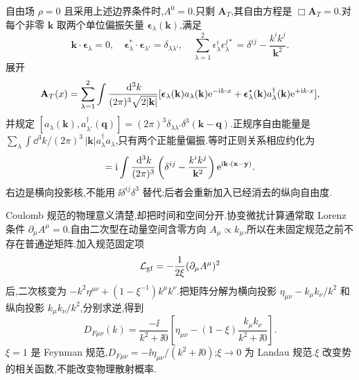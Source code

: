 自由场 $\rho=0$ 且采用上述边界条件时,$A^0=0$.只剩 $\mathbf A_T$,其自由方程是 $\Box\mathbf A_T=0$.对每个非零 $\mathbf k$ 取两个单位偏振矢量 $\boldsymbol\epsilon_\lambda(\mathbf k)$,满足
\begin{equation}
 \mathbf k\cdot\boldsymbol\epsilon_\lambda=0,
 \quad\boldsymbol\epsilon_\lambda^*\cdot\boldsymbol\epsilon_{\lambda'}=\delta_{\lambda\lambda'},
 \quad\sum_{\lambda=1}^2\epsilon_\lambda^i\epsilon_\lambda^{j*}
 =\delta^{ij}-\frac{k^ik^j}{\mathbf k^2}.
\end{equation}
展开
\begin{equation}
 \mathbf A_T(x)=\sum_{\lambda=1}^2\int\frac{\,\mathrm d^3k}{(2\pi)^3\sqrt{2|\mathbf k|}}
 [\boldsymbol\epsilon_\lambda(\mathbf k)a_\lambda(\mathbf k)\mathrm e^{-\mathrm i k\cdot x}
 +\boldsymbol\epsilon_\lambda^*(\mathbf k)a_\lambda^\dagger(\mathbf k)\mathrm e^{+\mathrm i k\cdot x}],
\end{equation}
并规定 $[a_\lambda(\mathbf k),a_{\lambda'}^\dagger(\mathbf q)]=(2\pi)^3\delta_{\lambda\lambda'}\delta^3(\mathbf k-\mathbf q)$.正规序自由能量是 $\sum_\lambda\int\dd^3k/(2\pi)^3\,|\mathbf k|a_\lambda^\dagger a_\lambda$,只有两个正能量偏振.等时正则关系相应约化为
\begin{equation}
 [A_T^i(t,\mathbf x),\Pi_T^j(t,\mathbf y)]
 =\ii\int\frac{\dd^3k}{(2\pi)^3}
 \left(\delta^{ij}-\frac{k^ik^j}{\mathbf k^2}\right)
 \e^{\ii\mathbf k\cdot(\mathbf x-\mathbf y)}.
\end{equation}
右边是横向投影核,不能用 $\ii\delta^{ij}\delta^3$ 替代;后者会重新加入已经消去的纵向自由度.


Coulomb 规范的物理意义清楚,却把时间和空间分开.协变微扰计算通常取 Lorenz 条件 $\partial_\mu A^\mu=0$.自由二次型在动量空间含零方向 $A_\mu\propto k_\mu$,所以在未固定规范之前不存在普通逆矩阵.加入规范固定项
\begin{equation}
 \mathcal L_{\rm gf}=-\frac{1}{2\xi}(\partial_\mu A^\mu)^2
\end{equation}
后,二次核变为 $-k^2\eta^{\mu\nu}+(1-\xi^{-1})k^\mu k^\nu$.把矩阵分解为横向投影 $\eta_{\mu\nu}-k_\mu k_\nu/k^2$ 和纵向投影 $k_\mu k_\nu/k^2$,分别求逆,得到
\begin{equation}
 D_{F\mu\nu}(k)=\frac{-\ii}{k^2+\ii0}
 \left[\eta_{\mu\nu}-(1-\xi)\frac{k_\mu k_\nu}{k^2+\ii0}\right].
 \label{eq:photon-covariant-propagator}
\end{equation}
$\xi=1$ 是 Feynman 规范,$D_{F\mu\nu}=-\ii\eta_{\mu\nu}/(k^2+\ii0)$;$\xi\to0$ 为 Landau 规范.$\xi$ 改变势的相关函数,不能改变物理散射概率.

